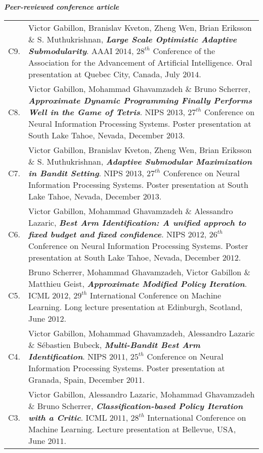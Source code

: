 \noindent\textit{\textbf{Peer-reviewed conference article}}\\
\noindent\begin{tabularx}{\columnwidth}{@{} l X @{}}
C9. & Victor Gabillon, Branislav Kveton, Zheng Wen, Brian Eriksson $\&$ S. Muthukrishnan, \textbf{\emph{Large Scale Optimistic Adaptive Submodularity}}.
AAAI $2014$, $28^{th}$ Conference of the Association for the Advancement of  Artificial Intelligence.
Oral presentation at Quebec City, Canada, July $2014$.\\

C8. & Victor Gabillon, Mohammad Ghavamzadeh $\&$ Bruno Scherrer, 
\textbf{\emph{Approximate Dynamic Programming Finally Performs Well in the Game of Tetris}}.
NIPS $2013$, $27^{th}$ Conference on Neural Information Processing Systems.
Poster presentation at South Lake Tahoe, Nevada, December $2013$.\\


C7. & Victor Gabillon, Branislav Kveton, Zheng Wen, Brian Eriksson $\&$ S. Muthukrishnan, \textbf{\emph{Adaptive Submodular Maximization in Bandit Setting}}.
NIPS $2013$, $27^{th}$ Conference on Neural Information Processing Systems.
Poster presentation at South Lake Tahoe, Nevada, December $2013$.\\


C6. & Victor Gabillon, Mohammad Ghavamzadeh $\&$  Alessandro Lazaric, \textbf{\emph{Best Arm Identification: A unified approch to fixed budget and fixed confidence}}.
NIPS $2012$, $26^{th}$ Conference on Neural Information Processing Systems.
Poster presentation at South Lake Tahoe, Nevada, December $2012$.\\


C5. & Bruno Scherrer, Mohammad Ghavamzadeh, Victor Gabillon $\&$ Matthieu Geist, \textbf{\emph{Approximate Modified Policy Iteration}}.
ICML $2012$, $29^{th}$  International Conference on Machine Learning.
Long lecture presentation at Edinburgh, Scotland, June $2012$.\\


C4. & Victor Gabillon, Mohammad Ghavamzadeh, Alessandro Lazaric $\&$ Sébastien Bubeck, \textbf{\emph{Multi-Bandit Best Arm Identification}}.
NIPS $2011$, $25^{th}$ Conference on Neural Information Processing Systems.
Poster presentation at Granada, Spain, December $2011$.\\


C3. & Victor Gabillon, Alessandro Lazaric, Mohammad Ghavamzadeh $\&$  Bruno Scherrer, \textbf{ \emph{Classification-based Policy Iteration with a Critic}}. ICML $2011$, $28^{th}$  International Conference on Machine Learning. Lecture presentation at Bellevue, USA, June $2011$.\\


\end{tabularx}
